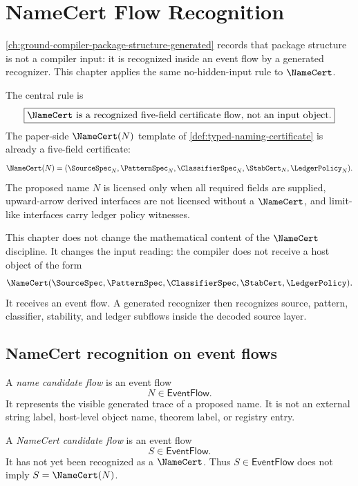 \chapter{NameCert Flow Recognition}
\label{ch:ground-compiler-namecert-flow-recognition}

\autoref{ch:ground-compiler-package-structure-generated} records that package structure is not a compiler input: it is recognized inside an event flow by a generated recognizer. This chapter applies the same no-hidden-input rule to $\NameCert$.

The central rule is
$$
  \boxed{\text{$\NameCert$ is a recognized five-field certificate flow, not an input object}.}
$$
The paper-side $\NameCert(N)$ template of \autoref{def:typed-naming-certificate} is already a five-field certificate:
$$
  \NameCert(N)
  =
  (\SourceSpec_N,\PatternSpec_N,\ClassifierSpec_N,\StabCert_N,\LedgerPolicy_N).
$$
The proposed name $N$ is licensed only when all required fields are supplied, upward-arrow derived interfaces are not licensed without a $\NameCert$, and limit-like interfaces carry ledger policy witnesses.

This chapter does not change the mathematical content of the $\NameCert$ discipline. It changes the input reading: the compiler does not receive a host object of the form
$$
  \NameCert(\SourceSpec,\PatternSpec,\ClassifierSpec,\StabCert,\LedgerPolicy).
$$
It receives an event flow. A generated recognizer then recognizes source, pattern, classifier, stability, and ledger subflows inside the decoded source layer.

\section{NameCert recognition on event flows}
\label{sec:namecert-generated-recognition}

\begin{definition}
\label{def:namecert-generated-name-candidate-flow}
A \emph{name candidate flow} is an event flow
$$
  N \in \mathsf{EventFlow}.
$$
It represents the visible generated trace of a proposed name. It is not an external string label, host-level object name, theorem label, or registry entry.
\end{definition}

\begin{definition}
\label{def:namecert-generated-candidate-flow}
A \emph{NameCert candidate flow} is an event flow
$$
  S \in \mathsf{EventFlow}.
$$
It has not yet been recognized as a $\NameCert$. Thus $S \in \mathsf{EventFlow}$ does not imply $S=\NameCert(N)$.
\end{definition}

